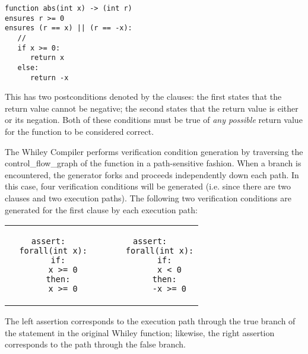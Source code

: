 \begin{tcolorbox}\begin{lstlisting}[language=Whiley]
function abs(int x) -> (int r)
ensures r >= 0
ensures (r == x) || (r == -x):
   //
   if x >= 0:
      return x
   else:
      return -x
\end{lstlisting}\end{tcolorbox}

This has two postconditions denoted by the 
clauses: the first states that the return value cannot be negative;
the second states that the return value is either  or its
negation.  Both of these conditions must be true of {\em any possible}
return value for the function to be considered correct.

The Whiley Compiler performs verification condition generation by
traversing the \gls{control_flow_graph} of the function in a
path-sensitive fashion.  When a branch is encountered, the generator
forks and proceeds independently down each path.  In this case, four
verification conditions will be generated (i.e. since there are two
 clauses and two execution paths).  The following
two verification conditions are generated for the first clause by each
execution path:

\begin{center}
\begin{tabular}{c c c}
\begin{minipage}[t]{0.45\textwidth}
\begin{tcolorbox}\begin{lstlisting}[language=WyAL]
assert:
  forall(int x):
    if:
      x >= 0
    then:
      x >= 0
\end{lstlisting}\end{tcolorbox}
\end{minipage}&&
\begin{minipage}[t]{0.45\textwidth}
\begin{tcolorbox}\begin{lstlisting}[language=WyAL]
  assert:
    forall(int x):
      if:
        x < 0
      then:
        -x >= 0
\end{lstlisting}\end{tcolorbox}
\end{minipage}\\
\end{tabular}
\end{center}
The left assertion corresponds to the execution path through the true
branch of the  statement in the original Whiley
function; likewise, the right assertion corresponds to the path
through the false branch.

